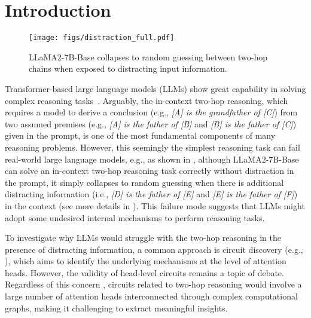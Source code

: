 \section{Introduction}
\label{sec:intro}

\begin{figure}[h]
    \centering
    \texttt{[image: figs/distraction\_full.pdf]}
    \caption{LLaMA2-7B-Base collapses to random guessing between two-hop chains when exposed to distracting input information.}
    \label{fig:llm-distraction}
\end{figure}


Transformer-based large language models (LLMs) show great capability in solving complex reasoning tasks~\citep{reynolds2021prompt,kojima2022large,brown2020language,wei2022chain,wang2022self,nye2021show,cobbe2021training,zelikman2022star}. Arguably, the in-context two-hop reasoning, which requires a model to derive a conclusion (e.g., \emph{[A] is the grandfather of [C]}) from two assumed premises (e.g., \emph{[A] is the father of [B]} and \emph{[B] is the father of [C]}) given in the prompt, is one of the most fundamental components of many reasoning problems. However, this seemingly the simplest reasoning task can fail real-world large language models, e.g., as shown in , although LLaMA2-7B-Base can solve an in-context two-hop reasoning task correctly without distraction in the prompt, it simply collapses to random guessing when there is additional distracting information (i.e., \emph{[D] is the father of [E]} and \emph{[E] is the father of [F]}) in the context (see more details in ). This failure mode suggests that LLMs might adopt some undesired internal mechanisms to perform reasoning tasks. 


To investigate why LLMs would struggle with the two-hop reasoning in the presence of distracting information, a common approach is circuit discovery (e.g., \citet{conmy2023towards}), which aims to identify the underlying mechanisms at the level of attention heads. However, the validity of head-level circuits remains a topic of debate. Regardless of this concern , circuits related to two-hop reasoning would involve a large number of attention heads interconnected through complex computational graphs, making it challenging to extract meaningful insights.



